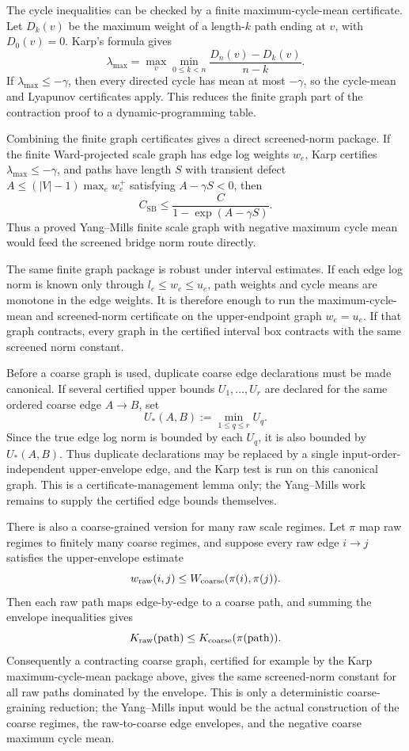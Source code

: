 The cycle inequalities can be checked by a finite maximum-cycle-mean
certificate. Let $D_k(v)$ be the maximum weight of a length-$k$ path ending at
$v$, with $D_0(v)=0$. Karp's formula gives
\[
  \lambda_{\max}
  =
  \max_v \min_{0\leq k<n}
  \frac{D_n(v)-D_k(v)}{n-k}.
\]
If $\lambda_{\max}\leq-\gamma$, then every directed cycle has mean at most
$-\gamma$, so the cycle-mean and Lyapunov certificates apply. This reduces the
finite graph part of the contraction proof to a dynamic-programming table.

Combining the finite graph certificates gives a direct screened-norm package.
If the finite Ward-projected scale graph has edge log weights $w_e$, Karp
certifies $\lambda_{\max}\leq-\gamma$, and paths have length $S$ with transient
defect $A\leq(|V|-1)\max_e w_e^+$ satisfying $A-\gamma S<0$, then
\[
  C_{\mathrm{SB}}
  \leq
  \frac{C}{1-\exp(A-\gamma S)} .
\]
Thus a proved Yang--Mills finite scale graph with negative maximum cycle mean
would feed the screened bridge norm route directly.

The same finite graph package is robust under interval estimates. If each
edge log norm is known only through $l_e\leq w_e\leq u_e$, path weights and
cycle means are monotone in the edge weights. It is therefore enough to run
the maximum-cycle-mean and screened-norm certificate on the upper-endpoint
graph $w_e=u_e$. If that graph contracts, every graph in the certified
interval box contracts with the same screened norm constant.

Before a coarse graph is used, duplicate coarse edge declarations must be made
canonical. If several certified upper bounds $U_1,\ldots,U_r$ are declared for
the same ordered coarse edge $A\to B$, set
\[
  U_*(A,B):=\min_{1\leq q\leq r} U_q .
\]
Since the true edge log norm is bounded by each $U_q$, it is also bounded by
$U_*(A,B)$. Thus duplicate declarations may be replaced by a single
input-order-independent upper-envelope edge, and the Karp test is run on this
canonical graph. This is a certificate-management lemma only; the Yang--Mills
work remains to supply the certified edge bounds themselves.

There is also a coarse-grained version for many raw scale regimes. Let
$\pi$ map raw regimes to finitely many coarse regimes, and suppose every raw
edge $i\to j$ satisfies the upper-envelope estimate
\[
  w_{\rm raw}(i,j)\leq W_{\rm coarse}(\pi(i),\pi(j)).
\]
Then each raw path maps edge-by-edge to a coarse path, and summing the
envelope inequalities gives
\[
  K_{\rm raw}({\rm path})
  \leq
  K_{\rm coarse}(\pi({\rm path})) .
\]
Consequently a contracting coarse graph, certified for example by the Karp
maximum-cycle-mean package above, gives the same screened-norm constant for
all raw paths dominated by the envelope. This is only a deterministic
coarse-graining reduction; the Yang--Mills input would be the actual
construction of the coarse regimes, the raw-to-coarse edge envelopes, and the
negative coarse maximum cycle mean.


